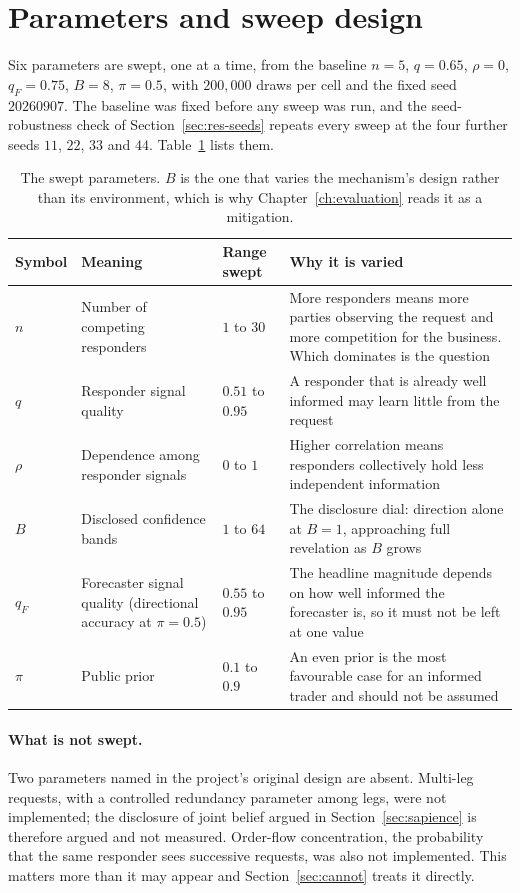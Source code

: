 \section{Parameters and sweep design}
\label{sec:sweep}

Six parameters are swept, one at a time, from the baseline $n=5$, $q=0.65$, $\rho=0$,
$q_F=0.75$, $B=8$, $\pi=0.5$, with $200{,}000$ draws per cell and the fixed seed
$20260907$. The baseline was fixed before any sweep was run, and the seed-robustness check
of Section~\ref{sec:res-seeds} repeats every sweep at the four further seeds $11$, $22$,
$33$ and $44$. Table~\ref{tab:params} lists them.

\begin{table}[htbp]
\centering
\begin{tabularx}{\textwidth}{p{}p{}p{}X}
\toprule
\textbf{Symbol} & \textbf{Meaning} & \textbf{Range swept} & \textbf{Why it is varied} \\
\midrule
$n$ & Number of competing responders & $1$ to $30$ & More responders means more parties observing the request and more competition for the business. Which dominates is the question \\
$q$ & Responder signal quality & $0.51$ to $0.95$ & A responder that is already well informed may learn little from the request \\
$\rho$ & Dependence among responder signals & $0$ to $1$ & Higher correlation means responders collectively hold less independent information \\
$B$ & Disclosed confidence bands & $1$ to $64$ & The disclosure dial: direction alone at $B=1$, approaching full revelation as $B$ grows \\
$q_F$ & Forecaster signal quality (directional accuracy at $\pi = 0.5$) & $0.55$ to $0.95$ & The headline magnitude depends on how well informed the forecaster is, so it must not be left at one value \\
$\pi$ & Public prior & $0.1$ to $0.9$ & An even prior is the most favourable case for an informed trader and should not be assumed \\
\bottomrule
\end{tabularx}
\caption{The swept parameters. $B$ is the one that varies the mechanism's design rather than
its environment, which is why Chapter~\ref{ch:evaluation} reads it as a mitigation.}
\label{tab:params}
\end{table}

\paragraph{What is not swept.} Two parameters named in the project's original design are
absent. Multi-leg requests, with a controlled redundancy parameter among legs, were not
implemented; the disclosure of joint belief argued in Section~\ref{sec:sapience} is
therefore argued and not measured. Order-flow concentration, the probability that the same
responder sees successive requests, was also not implemented. This matters more than it may
appear and Section~\ref{sec:cannot} treats it directly.

